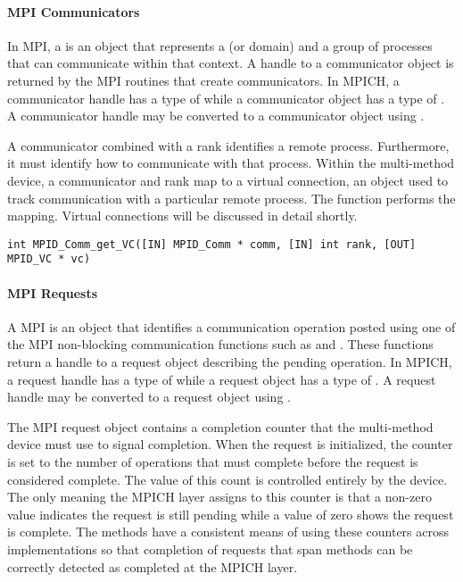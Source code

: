 
\paragraph{MPI Communicators}

In MPI, a  is an object that represents a
 (or domain) and a group of processes that can
communicate within that context.  A handle to a communicator object is returned
by the MPI routines that create communicators.  In MPICH, a communicator handle
has a type of  while a communicator object has a type of
.  A communicator handle may be converted to a communicator
object using .

A communicator combined with a rank identifies a remote process.  Furthermore,
it must identify how to communicate with that process.  Within the multi-method
device, a communicator and rank map to a virtual connection, an object used to
track communication with a particular remote process.  The function
 performs the mapping.  Virtual connections will be
discussed in detail shortly.

\begin{verbatim}
int MPID_Comm_get_VC([IN] MPID_Comm * comm, [IN] int rank, [OUT] MPID_VC * vc)
\end{verbatim}


\paragraph{MPI Requests}

A MPI  is an object that identifies a communication operation
posted using one of the MPI non-blocking communication functions such as
 and .  These functions return a handle to a
request object describing the pending operation.  In MPICH, a request handle
has a type of  while a request object has a type of
.  A request handle may be converted to a request object
using .

\begin{comment}
  Is this mapping of objects to types true for requests?  They appear to be
  treated differently that other MPI types in the design document.
\end{comment}

The MPI request object contains a completion counter that the multi-method
device must use to signal completion.  When the request is initialized, the
counter is set to the number of operations that must complete before the
request is considered complete.  The value of this count is controlled
entirely by the device.  The only meaning the MPICH layer assigns to this
counter is that a non-zero value indicates the request is still pending while
a value of zero shows the request is complete.  The methods have a consistent
means of using these counters across implementations so that completion of
requests that span methods can be correctly detected as completed at the MPICH
layer.

